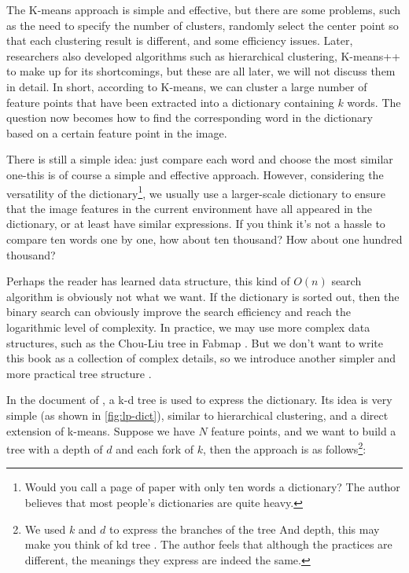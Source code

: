 The K-means approach is simple and effective, but there are some problems, such as the need to specify the number of clusters, randomly select the center point so that each clustering result is different, and some efficiency issues. Later, researchers also developed algorithms such as hierarchical clustering, K-means++{\cite{Arthur2007}} to make up for its shortcomings, but these are all later, we will not discuss them in detail. In short, according to K-means, we can cluster a large number of feature points that have been extracted into a dictionary containing $k$ words. The question now becomes how to find the corresponding word in the dictionary based on a certain feature point in the image.

There is still a simple idea: just compare each word and choose the most similar one-this is of course a simple and effective approach. However, considering the versatility of the dictionary\footnote{Would you call a page of paper with only ten words a dictionary? The author believes that most people's dictionaries are quite heavy. }, we usually use a larger-scale dictionary to ensure that the image features in the current environment have all appeared in the dictionary, or at least have similar expressions. If you think it’s not a hassle to compare ten words one by one, how about ten thousand? How about one hundred thousand?

Perhaps the reader has learned data structure, this kind of $O(n)$ search algorithm is obviously not what we want. If the dictionary is sorted out, then the binary search can obviously improve the search efficiency and reach the logarithmic level of complexity. In practice, we may use more complex data structures, such as the Chou-Liu tree {\cite{Chow1968}} in Fabmap {\cite{Cummins2008, Cummins2010, Cummins2011}}. But we don't want to write this book as a collection of complex details, so we introduce another simpler and more practical tree structure {\cite{Galvez-Lopez2012}}.

In the document of \cite{Galvez-Lopez2012}, a k-d tree is used to express the dictionary. Its idea is very simple (as shown in \autoref{fig:lp-dict}), similar to hierarchical clustering, and a direct extension of k-means. Suppose we have $N$ feature points, and we want to build a tree with a depth of $d$ and each fork of $k$, then the approach is as follows\footnote{We used $k$ and $d$ to express the branches of the tree And depth, this may make you think of kd tree \textsuperscript{\cite{Bentley1975}}. The author feels that although the practices are different, the meanings they express are indeed the same. }:

